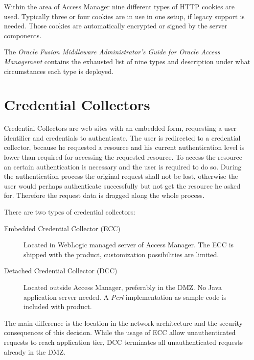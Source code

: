 Within the area of Access Manager nine different types of HTTP cookies
are used. Typically three or four cookies are in use in one setup,
if legacy support is needed. Those cookies are automatically encrypted
or signed by the server components.

The \emph{Oracle Fusion Middleware Administrator's Guide for Oracle Access
Management} contains the exhausted list of nine types and description
under what circumstances each type is deployed.



\section{Credential Collectors}

Credential Collectors are web sites with an embedded form, requesting a
user identifier and  credentials to authenticate. The user is redirected
to a credential collector, because he requested a resource and his
current authentication level is lower than required for accessing the
requested resource. To access the resource an certain authentication is
necessary and the user is required to do so. During the authentication
process the original request shall not be lost, otherwise the user would
perhaps authenticate successfully but not get the resource he asked for.
Therefore the request data is dragged along the whole process.

There are two types of credential collectors:

\begin{description}

    \item[Embedded Credential Collector (ECC)] Located in 
        WebLogic managed server of Access Manager. The ECC is shipped
        with the product, customization possibilities are limited.

    \item[Detached Credential Collector (DCC)] Located outside 
        Access Manager, preferably in the DMZ\@. No Java application
        server needed. A \emph{Perl} implementation as sample code is 
        included with product.

\end{description}

The main difference is the location in the network architecture and the
security consequences of this decision. While the usage of ECC allow 
unauthenticated requests to reach application tier, DCC terminates all
unauthenticated requests already in the DMZ\@. 



